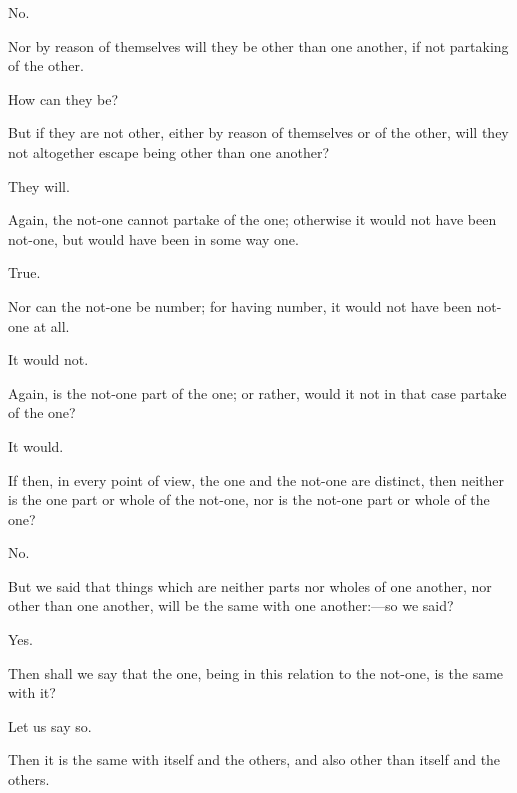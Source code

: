 \documentclass[11pt,letter]{article}
\begin{document}
\par  No.

\par  Nor by reason of themselves will they be other than one another, if not partaking of the other.

\par  How can they be?

\par  But if they are not other, either by reason of themselves or of the other, will they not altogether escape being other than one another?

\par  They will.

\par  Again, the not-one cannot partake of the one; otherwise it would not have been not-one, but would have been in some way one.

\par  True.

\par  Nor can the not-one be number; for having number, it would not have been not-one at all.

\par  It would not.

\par  Again, is the not-one part of the one; or rather, would it not in that case partake of the one?

\par  It would.

\par  If then, in every point of view, the one and the not-one are distinct, then neither is the one part or whole of the not-one, nor is the not-one part or whole of the one?

\par  No.

\par  But we said that things which are neither parts nor wholes of one another, nor other than one another, will be the same with one another:—so we said?

\par  Yes.

\par  Then shall we say that the one, being in this relation to the not-one, is the same with it?

\par  Let us say so.

\par  Then it is the same with itself and the others, and also other than itself and the others.
\end{document}

